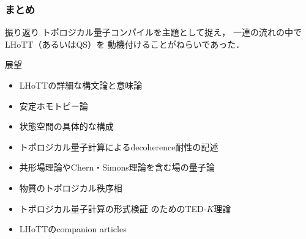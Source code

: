 \documentclass{beamer} %
\newcommand{\0}{\mathbf{0}}
\newcommand{\1}{\mathbf{1}}
\newcommand{\2}{\mathbf{2}}
\begin{document}
\begin{frame}
  \frametitle{まとめ}
  \begin{block}{振り返り}
    トポロジカル量子コンパイルを主題として捉え，
    一連の流れの中でLHoTT（あるいはQS）を
    動機付けることがねらいであった．
  \end{block}
  \begin{block}{展望}
    \begin{itemize}
      \item LHoTTの詳細な構文論と意味論
      \item 安定ホモトピー論
      \item 状態空間の具体的な構成
      \item トポロジカル量子計算によるdecoherence耐性の記述
      \item 共形場理論やChern・Simons理論を含む場の量子論
      \item 物質のトポロジカル秩序相
      \item トポロジカル量子計算の形式検証
            のためのTED-\(K\)理論
      \item LHoTTのcompanion articles
    \end{itemize}
  \end{block}
\end{frame}


\end{document}
